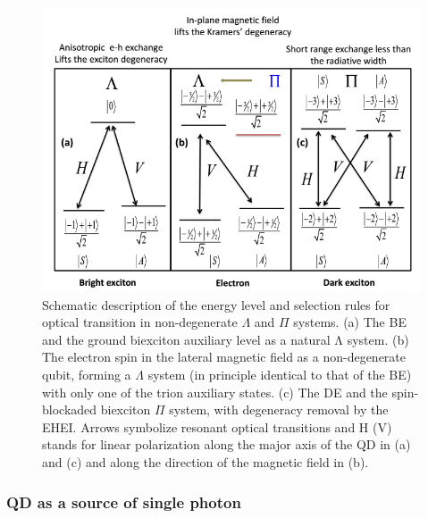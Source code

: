 \begin{figure}[H]
	\centering
	\includegraphics[scale=0.8]{figures/Lambda_System.png}
	\caption{Schematic description of the energy level and selection rules for
optical transition in non-degenerate $\Lambda$ and $\Pi$ systems. (a) The BE and the ground biexciton auxiliary level as a natural Λ system. (b) The electron spin in the lateral magnetic field as a non-degenerate qubit, forming a $\Lambda$ system (in principle identical to that of the BE) with only one of the trion auxiliary states. (c) The DE and the spin-blockaded biexciton $\Pi$ system, with degeneracy removal by the EHEI. Arrows symbolize resonant optical transitions and H (V) stands for linear polarization along the major axis of the QD in (a) and (c) and along the direction of the magnetic field in (b).}
	\label{fig:PiSystem}
\end{figure}
\subsubsection{QD as a source of single photon}
